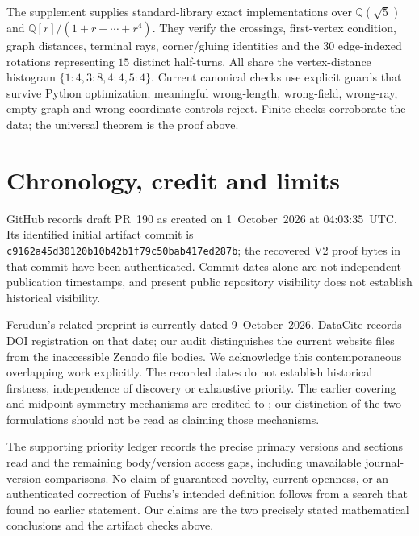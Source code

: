 \documentclass[11pt]{amsart}
\theoremstyle{remark}
\begin{document}
The supplement supplies standard-library exact implementations over $\mathbb Q(\sqrt5)$ and $\mathbb Q[r]/(1+r+\cdots+r^4)$. They verify the crossings, first-vertex condition, graph distances, terminal rays, corner/gluing identities and the $30$ edge-indexed rotations representing $15$ distinct half-turns. All share the vertex-distance histogram $\{1:4,3:8,4:4,5:4\}$. Current canonical checks use explicit guards that survive Python optimization; meaningful wrong-length, wrong-field, wrong-ray, empty-graph and wrong-coordinate controls reject. Finite checks corroborate the data; the universal theorem is the proof above.

\section{Chronology, credit and limits}
GitHub records draft PR~190 as created on 1~October~2026 at 04:03:35~UTC. Its identified initial artifact commit is
\texttt{c9162a45d30120b10b42b1f79c50bab417ed287b}; the recovered V2 proof bytes in that commit have been authenticated. Commit dates alone are not independent publication timestamps, and present public repository visibility does not establish historical visibility.

Ferudun's related preprint \cite{Ferudun} is currently dated 9~October~2026. DataCite records DOI registration on that date; our audit distinguishes the current website files from the inaccessible Zenodo file bodies. We acknowledge this contemporaneous overlapping work explicitly. The recorded dates do not establish historical firstness, independence of discovery or exhaustive priority. The earlier covering and midpoint symmetry mechanisms are credited to \cite{AAH,Troubetzkoy}; our distinction of the two formulations should not be read as claiming those mechanisms.

The supporting priority ledger records the precise primary versions and sections read and the remaining body/version access gaps, including unavailable journal-version comparisons. No claim of guaranteed novelty, current openness, or an authenticated correction of Fuchs's intended definition follows from a search that found no earlier statement. Our claims are the two precisely stated mathematical conclusions and the artifact checks above.
\end{document}
